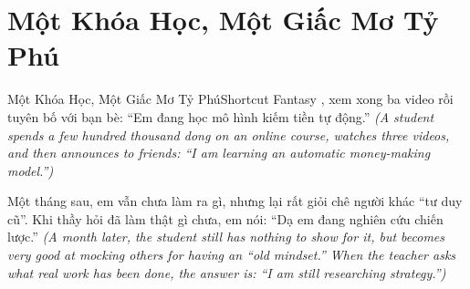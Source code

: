 \section{Một Khóa Học, Một Giấc Mơ Tỷ Phú}
\begin{truyen}{Một Khóa Học, Một Giấc Mơ Tỷ Phú}{Shortcut Fantasy}
, xem xong ba video rồi tuyên bố với bạn bè: ``Em đang học mô hình kiếm tiền tự động.''
\textit{(A student spends a few hundred thousand dong on an online course, watches three videos, and then announces to friends: ``I am learning an automatic money-making model.'')}

Một tháng sau, em vẫn chưa làm ra gì, nhưng lại rất giỏi chê người khác ``tư duy cũ''. Khi thầy hỏi đã làm thật gì chưa, em nói: ``Dạ em đang nghiên cứu chiến lược.''
\textit{(A month later, the student still has nothing to show for it, but becomes very good at mocking others for having an ``old mindset.'' When the teacher asks what real work has been done, the answer is: ``I am still researching strategy.'')}

\end{truyen}

